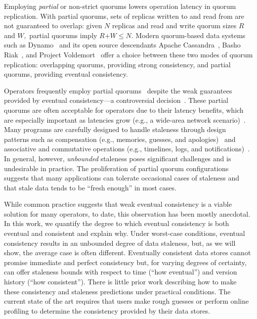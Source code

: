 \documentclass{vldb}
\begin{document}
Employing \textit{partial} or non-strict quorums lowers operation
latency in quorum replication.  With partial quorums, sets of replicas
written to and read from are not guaranteed to overlap: given $N$
replicas and read and write quorum sizes $R$ and $W,$ partial quorums
imply $R$$+$$W$$\leq$$N$.  Modern quorum-based data systems such as
Dynamo~\cite{dynamo} and its open source descendants Apache
Cassandra~\cite{cassandra-sigmod}, Basho Riak~\cite{riak}, and Project
Voldemort~\cite{voldemortpub} offer a choice between these two modes
of quorum replication: overlapping quorums, providing strong
consistency, and partial quorums, providing eventual consistency.

Operators frequently employ partial quorums~\cite{cassandra-docs,
  cassandradefault,feinbergpc,reddit, outbrain, maxperfblog} despite
the weak guarantees provided by eventual consistency---a controversial
decision~\cite{hamilton-cap, cops, walter, urbanmyths}.  These partial
quorums are often acceptable for operators due to their latency
benefits, which are especially important as latencies grow (e.g., a
wide-area network scenario)~\cite{abadilatconsist, feinbergpc,
  hamilton-cap, helland}. Many programs are carefully designed to
handle staleness through design patterns such as compensation (e.g.,
memories, guesses, and apologies)~\cite{helland} and associative and
commutative operations (e.g., timelines, logs, and
notifications)~\cite{calm}.  In general, however, \textit{unbounded}
staleness poses significant challenges and is undesirable in practice.
The proliferation of partial quorum configurations suggests that many
applications can tolerate occasional cases of staleness and that stale
data tends to be ``fresh enough'' in most cases.

While common practice suggests that weak eventual consistency is a
viable solution for many operators, to date, this observation has been
mostly anecdotal. In this work, we quantify the degree to which
eventual consistency is both eventual and consistent and explain
why. Under worst-case conditions, eventual consistency results in an
unbounded degree of data staleness, but, as we will show, the average
case is often different.  Eventually consistent data stores cannot
promise immediate and perfect consistency but, for varying degrees of
certainty, can offer staleness bounds with respect to time (``how
eventual'') and version history (``how consistent'').  There is little
prior work describing how to make these consistency and staleness
predictions under practical conditions.  The current state of the art
requires that users make rough guesses or perform online profiling to
determine the consistency provided by their data stores.
\end{document}
